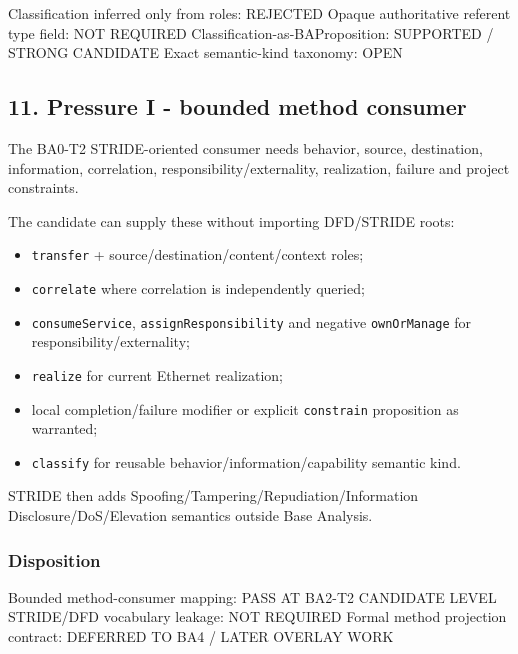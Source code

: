 \documentclass[
  10pt,
  letterpaper,
]{article}
\newenvironment{Shaded}{}{}
\newcommand{\NormalTok}[1]{#1}
\providecommand{\tightlist}{%
  \setlength{\itemsep}{0pt}\setlength{\parskip}{0pt}}
\begin{document}
\begin{Shaded}
\begin{Highlighting}[]
\NormalTok{Classification inferred only from roles: REJECTED}
\NormalTok{Opaque authoritative referent type field: NOT REQUIRED}
\NormalTok{Classification{-}as{-}BAProposition: SUPPORTED / STRONG CANDIDATE}
\NormalTok{Exact semantic{-}kind taxonomy: OPEN}
\end{Highlighting}
\end{Shaded}

\subsection{11. Pressure I - bounded method
consumer}\label{pressure-i---bounded-method-consumer}

The BA0-T2 STRIDE-oriented consumer needs behavior, source, destination,
information, correlation, responsibility/externality, realization,
failure and project constraints.

The candidate can supply these without importing DFD/STRIDE roots:

\begin{itemize}
\tightlist
\item
  \texttt{transfer} + source/destination/content/context roles;
\item
  \texttt{correlate} where correlation is independently queried;
\item
  \texttt{consumeService}, \texttt{assignResponsibility} and negative
  \texttt{ownOrManage} for responsibility/externality;
\item
  \texttt{realize} for current Ethernet realization;
\item
  local completion/failure modifier or explicit \texttt{constrain}
  proposition as warranted;
\item
  \texttt{classify} for reusable behavior/information/capability
  semantic kind.
\end{itemize}

STRIDE then adds Spoofing/Tampering/Repudiation/Information
Disclosure/DoS/Elevation semantics outside Base Analysis.

\subsubsection{Disposition}\label{disposition-7}

\begin{Shaded}
\begin{Highlighting}[]
\NormalTok{Bounded method{-}consumer mapping: PASS AT BA2{-}T2 CANDIDATE LEVEL}
\NormalTok{STRIDE/DFD vocabulary leakage: NOT REQUIRED}
\NormalTok{Formal method projection contract: DEFERRED TO BA4 / LATER OVERLAY WORK}
\end{Highlighting}
\end{Shaded}
\end{document}
